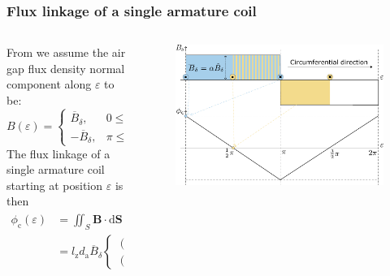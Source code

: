 \begin{frame}
	\frametitle{Flux linkage of a single armature coil}
	\begin{columns}
		\begin{column}{0.45\textwidth}
			From   we assume the air gap flux density normal component along $\varepsilon$ to be:
			\begin{equation}
				B(\varepsilon) = \begin{cases}
					\overline{B}_\delta, &  0 \leq \varepsilon < \pi,\\
					-\overline{B}_\delta, &  \pi \leq \varepsilon < 2\pi.
				\end{cases}
				\label{eq:Air_gap_flux_density_DC_machine_circumference}
			\end{equation}
			The flux linkage of a single armature coil starting at position $\varepsilon$ is then
			\begin{equation}
				\begin{split}
				\phi_\mathrm{c}(\varepsilon) &= \iint_{S} \bm{B} \cdot \mathrm{d}\bm{S}
											 = l_\mathrm{z}d_\mathrm{a}\int_{\varepsilon}^{\varepsilon+\pi}B(\varepsilon) \mathrm{d}\varepsilon \\
											 & = l_\mathrm{z}d_\mathrm{a}\overline{B}_\delta\begin{cases}
												(\pi/2 - \varepsilon), &  0 \leq \varepsilon < \pi,\\
												(\varepsilon - 3\pi/2), &  \pi \leq \varepsilon < 2\pi.
											\end{cases}.
				\end{split}
				\label{eq:Flux_linkage_single_coil}
			\end{equation}
		\end{column}
	\hfill
	\begin{column}{0.55\textwidth}
		\begin{figure}
			\centering
			\includegraphics[height=0.6\textheight]{fig/lec03/Flux_density_and_linkage.pdf}

\end{figure}
\end{column}
\end{columns}
\end{frame}
